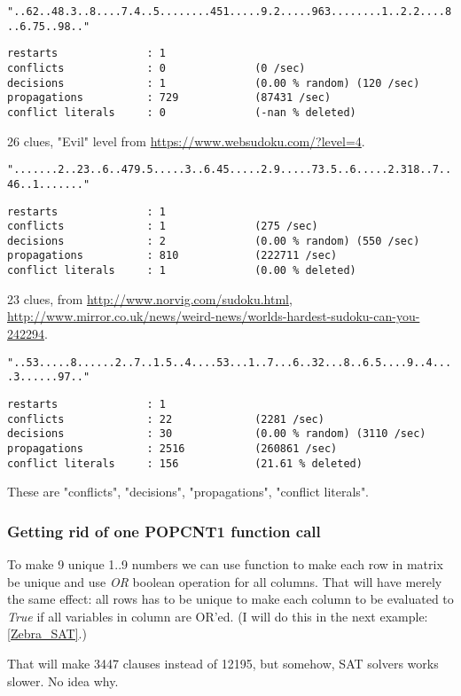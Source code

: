 \verb|"..62..48.3..8....7.4..5........451.....9.2.....963........1..2.2....8..6.75..98.."|

\begin{lstlisting}
restarts              : 1
conflicts             : 0              (0 /sec)
decisions             : 1              (0.00 % random) (120 /sec)
propagations          : 729            (87431 /sec)
conflict literals     : 0              (-nan % deleted)
\end{lstlisting}

26 clues, "Evil" level from \url{https://www.websudoku.com/?level=4}.

\verb|".......2..23..6..479.5.....3..6.45.....2.9.....73.5..6.....2.318..7..46..1......."|

\begin{lstlisting}
restarts              : 1
conflicts             : 1              (275 /sec)
decisions             : 2              (0.00 % random) (550 /sec)
propagations          : 810            (222711 /sec)
conflict literals     : 1              (0.00 % deleted)
\end{lstlisting}

23 clues, from
\url{http://www.norvig.com/sudoku.html},
\url{http://www.mirror.co.uk/news/weird-news/worlds-hardest-sudoku-can-you-242294}.

\verb|"..53.....8......2..7..1.5..4....53...1..7...6..32...8..6.5....9..4....3......97.."|

\begin{lstlisting}
restarts              : 1
conflicts             : 22             (2281 /sec)
decisions             : 30             (0.00 % random) (3110 /sec)
propagations          : 2516           (260861 /sec)
conflict literals     : 156            (21.61 % deleted)
\end{lstlisting}

These are "conflicts", "decisions", "propagations", "conflict literals".

\subsubsection{Getting rid of one POPCNT1 function call}
\label{OR_in_POPCNT1}

To make 9 unique 1..9 numbers we can use  function to make each row in matrix be unique and
use \textit{OR} boolean operation for all columns.
That will have merely the same effect: all rows has to be unique to make each column to be evaluated
to \textit{True} if all variables in column are OR'ed.
(I will do this in the next example: \ref{Zebra_SAT}.)

That will make 3447 clauses instead of 12195, but somehow, SAT solvers works slower. No idea why.

